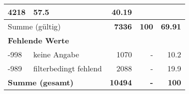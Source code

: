 \begin{longtable}{lXrrr}
       \num{4218} &
       \num[round-mode=places,round-precision=2]{57,5} &
         \num[round-mode=places,round-precision=2]{40,19} \\
     \midrule
     \multicolumn{2}{l}{Summe (gültig)} &
       \textbf{\num{7336}} &
     \textbf{100} &
       \textbf{\num[round-mode=places,round-precision=2]{69,91}} \\
     \multicolumn{5}{l}{\textbf{Fehlende Werte}}\\
       -998 &
       keine Angabe &
         \num{1070} &
        - &
         \num[round-mode=places,round-precision=2]{10,2} \\
       -989 &
       filterbedingt fehlend &
         \num{2088} &
        - &
         \num[round-mode=places,round-precision=2]{19,9} \\
     \midrule
     \multicolumn{2}{l}{\textbf{Summe (gesamt)}} &
          \textbf{\num{10494}} &
        \textbf{-} &
        \textbf{100} \\
     \bottomrule
     \end{longtable}
     
